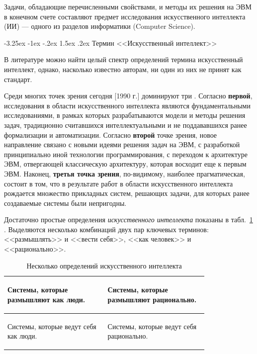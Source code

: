 \documentclass[12pt, openany, twoside]{book} %
\makeatletter
\renewcommand\section{\@startsection {section}{1}{\z@}%
                                   {-3.25ex \@plus -1ex \@minus -.2ex}%
                                   {1.5ex \@plus.2ex}%
                                   {\normalfont\large\bfseries}}
\makeatother
\begin{document}
Задачи,  обладающие перечисленными свойствами, и методы их решения на ЭВМ в конечном счете составляют предмет исследования искусственного интеллекта (ИИ) --- одного из разделов информатики (Computer Science).

\section{Термин <<Искусственный интеллект>>}

В литературе можно найти целый спектр определений термина искусственный интеллект, однако, насколько известно авторам, ни один из них не принят как стандарт.

Среди многих точек зрения сегодня [1990 г.] доминируют три \cite{AIDictionary}. Согласно {\bf первой}, исследования в области искусственного интеллекта являются фундаментальными исследованиями, в рамках которых разрабатываются модели и методы решения задач, традиционно считавшихся интеллектуальными и не поддававшихся ранее формализации и автоматизации. Согласно {\bf второй} точке зрения, новое направление связано с новыми идеями решения задач на ЭВМ, с разработкой принципиально иной технологии программирования, с переходом к архитектуре ЭВМ, отвергающей классическую архитектуру, которая восходит еще к первым ЭВМ. Наконец, {\bf третья точка зрения}, по-видимому, наиболее прагматическая, состоит в том, что в результате работ в области искусственного интеллекта рождается множество прикладных систем, решающих задачи, для которых ранее создаваемые системы были непригодны.

Достаточно простые определения {\em искусственного интеллекта} показаны в табл.~\ref{pic:determai} \cite{Russell}. Выделяются несколько комбинаций двух пар ключевых терминов: <<размышлять>> и <<вести себя>>, <<как человек>> и <<рационально>>.

\begin{table}[h]
\caption{Несколько определений искусственного интеллекта} \label{pic:determai}
\begin{center}
\begin{tabular}{|p{0.4\linewidth}|p{0.4\linewidth}|}
 \hline
 \begin{raggedright}
   Системы, которые размышляют как люди.
 \end{raggedright}
 &
 \begin{raggedright}
   Системы, которые размышляют рационально.
 \end{raggedright}
 \\\hline
 \begin{raggedright}
   Системы, которые ведут себя как
   люди.
 \end{raggedright}
 &
 \begin{raggedright}
   Системы, которые ведут себя рационально.
 \end{raggedright}
   \\\hline
\end{tabular}
\end{center}
\end{table}
\end{document}
